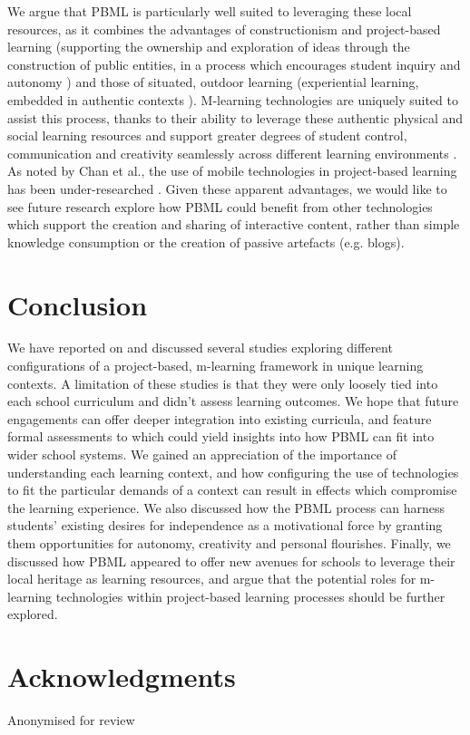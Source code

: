 \documentclass[,hyphens]{sigchi}
\begin{document}
We argue that PBML is particularly well suited to leveraging these local resources, as it combines the advantages of constructionism and project-based learning (supporting the ownership and exploration of ideas through the construction of public entities, in a process which encourages student inquiry and autonomy \cite{Noss2017, Larmer2015}) and those of situated, outdoor learning (experiential learning, embedded in authentic contexts \cite{Lave1991}). M-learning technologies are uniquely suited to assist this process, thanks to their ability to leverage these authentic physical and social learning resources and support greater degrees of student control, communication and creativity seamlessly across different learning environments \cite{Sharples2007, Richardson2018}. As noted by Chan et al., the use of mobile technologies in project-based learning has been under-researched \cite{Chan2015}. Given these apparent advantages, we would like to see future research explore how PBML could benefit from other technologies which support the creation and sharing of interactive content, rather than simple knowledge consumption or the creation of passive artefacts (e.g. blogs).

\section{Conclusion}
We have reported on and discussed several studies exploring different configurations of a project-based, m-learning framework in unique learning contexts. A limitation of these studies is that they were only loosely tied into each school curriculum and didn't assess learning outcomes. We hope that future engagements can offer deeper integration into existing curricula, and feature formal assessments to which could yield insights into how PBML can fit into wider school systems. We gained an appreciation of the importance of understanding each learning context, and how configuring the use of technologies to fit the particular demands of a context can result in effects which compromise the learning experience. We also discussed how the PBML process can harness students' existing desires for independence as a motivational force by granting them opportunities for autonomy, creativity and personal flourishes. Finally, we discussed how PBML appeared to offer new avenues for schools to leverage their local heritage as learning resources, and argue that the potential roles for m-learning technologies within project-based learning processes should be further explored.

\section{Acknowledgments}
Anonymised for review

\balance{}



\end{document}
